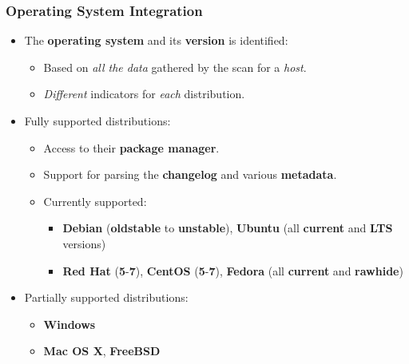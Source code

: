 \documentclass[aspectratio=169,xcolor={usenames,dvipsnames}]{beamer}
\begin{document}
\begin{frame}
	\frametitle{Operating System Integration}
	
	\begin{itemize}
		\item The \textbf{operating system} and its \textbf{version} is identified:
		\begin{itemize}
			\item Based on \textit{all the data} gathered by the scan for a \textit{host}.
			\item \textit{Different} indicators for \textit{each} distribution.
		\end{itemize}
		\item Fully supported distributions:
		\begin{itemize}
			\item Access to their \textbf{package manager}.
			\item Support for parsing the \textbf{changelog} and various \textbf{metadata}.
			\item Currently supported:
			\begin{itemize}
				\item \textbf{Debian} (\textbf{oldstable} to \textbf{unstable}), \textbf{Ubuntu} (all \textbf{current} and \textbf{LTS} versions)
				\item \textbf{Red Hat} (\textbf{5}-\textbf{7}), \textbf{CentOS} (\textbf{5}-\textbf{7}), \textbf{Fedora} (all \textbf{current} and \textbf{rawhide})
			\end{itemize}
		\end{itemize}
		\item Partially supported distributions:
		\begin{itemize}
			\item \textbf{Windows}
			\item \textbf{Mac OS X}, \textbf{FreeBSD}
		\end{itemize}
	\end{itemize}
\end{frame}
\end{document}
